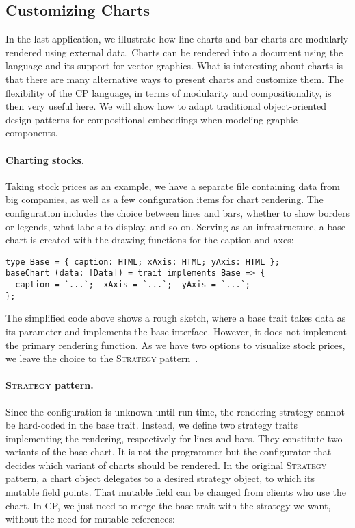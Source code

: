 \subsection{Customizing Charts} \label{sec:charts}

In the last application, we illustrate how line charts and bar charts are
modularly rendered using external data. Charts can be rendered into a document
using the \ExT language and its support for vector graphics. What is interesting
about charts is that there are many alternative ways to present charts and
customize them. The flexibility of the CP language, in terms of modularity and
compositionality, is then very useful here. We will show how to adapt
traditional object-oriented design patterns for compositional embeddings when
modeling graphic components.

\paragraph{Charting stocks.}
Taking stock prices as an example, we have a separate file containing data from
big companies, as well as a few configuration items for chart rendering. The
configuration includes the choice between lines and bars, whether to show
borders or legends, what labels to display, and so on. Serving as an
infrastructure, a base chart is created with the drawing functions for the
caption and axes:

\begin{lstlisting}
type Base = { caption: HTML; xAxis: HTML; yAxis: HTML };
baseChart (data: [Data]) = trait implements Base => {
  caption = `...`;  xAxis = `...`;  yAxis = `...`;
};
\end{lstlisting}

\noindent
The simplified code above shows a rough sketch, where a base trait takes data as
its parameter and implements the base interface. However, it does not implement
the primary rendering function. As we have two options to visualize stock
prices, we leave the choice to the \textsc{Strategy}
pattern~\citep{gamma1995design}.

\paragraph{\textsc{Strategy} pattern.}
Since the configuration is unknown until run time, the rendering strategy cannot
be hard-coded in the base trait. Instead, we define two strategy traits
implementing the rendering, respectively for lines and bars. They constitute two
variants of the base chart. It is not the programmer but the configurator that
decides which variant of charts should be rendered. In the original
\textsc{Strategy} pattern, a chart object delegates to a desired strategy
object, to which its mutable field points. That mutable field can be changed
from clients who use the chart. In CP, we just need to merge the base trait with
the strategy we want, without the need for mutable references:

